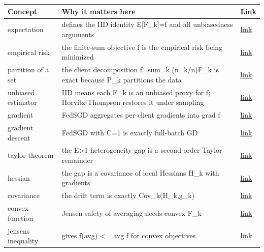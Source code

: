 \documentclass[11pt]{article}
\begin{document}
\begin{longtable}{p{} p{} p{}}
\toprule
\textbf{Concept} & \textbf{Why it matters here} & \textbf{Link} \\
\midrule
\endhead
\bottomrule
\endfoot
expectation & defines the IID identity E[F_k]=f and all unbiasedness arguments & \href{https://github.com/pleyva2004/math-foundations/blob/main/concepts/expectation.md}{link} \\
empirical risk & the finite-sum objective f is the empirical risk being minimized & \href{https://github.com/pleyva2004/math-foundations/blob/main/concepts/empirical-risk.md}{link} \\
partition of a set & the client decomposition f=sum_k (n_k/n)F_k is exact because {P_k} partitions the data & \href{https://github.com/pleyva2004/math-foundations/blob/main/concepts/partition-of-a-set.md}{link} \\
unbiased estimator & IID means each F_k is an unbiased proxy for f; Horvitz-Thompson restores it under sampling & \href{https://github.com/pleyva2004/math-foundations/blob/main/concepts/unbiased-estimator.md}{link} \\
gradient & FedSGD aggregates per-client gradients into grad f & \href{https://github.com/pleyva2004/math-foundations/blob/main/concepts/gradient.md}{link} \\
gradient descent & FedSGD with C=1 is exactly full-batch GD & \href{https://github.com/pleyva2004/math-foundations/blob/main/concepts/gradient-descent.md}{link} \\
taylor theorem & the E>1 heterogeneity gap is a second-order Taylor remainder & \href{https://github.com/pleyva2004/math-foundations/blob/main/concepts/taylor-theorem.md}{link} \\
hessian & the gap is a covariance of local Hessians H_k with gradients & \href{https://github.com/pleyva2004/math-foundations/blob/main/concepts/hessian.md}{link} \\
covariance & the drift term is exactly Cov_k(H_k,g_k) & \href{https://github.com/pleyva2004/math-foundations/blob/main/concepts/covariance.md}{link} \\
convex function & Jensen safety of averaging needs convex F_k & \href{https://github.com/pleyva2004/math-foundations/blob/main/concepts/convex-function.md}{link} \\
jensens inequality & gives f(avg) <= avg f for convex objectives & \href{https://github.com/pleyva2004/math-foundations/blob/main/concepts/jensens-inequality.md}{link} \\

\end{longtable}
\end{document}
